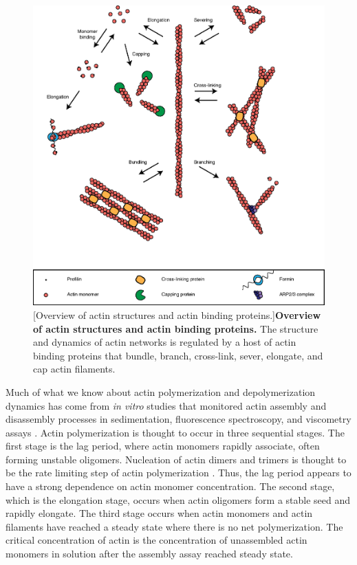 \documentclass{ucetd}
\begin{document}
\begin{figure}[h!]
\centering
\includegraphics[width=1\textwidth]{Figure1-2}
[Overview of actin structures and actin binding proteins.]{\textbf{Overview of actin structures and actin binding proteins.} The structure and dynamics of actin networks is regulated by a host of actin binding proteins that bundle, branch, cross-link, sever, elongate, and cap actin filaments.}
\end{figure}


Much of what we know about actin polymerization and depolymerization dynamics has come from \textit{in vitro} studies that monitored actin assembly and disassembly processes in sedimentation, fluorescence spectroscopy, and viscometry assays \cite{Pollard:2016hj}.  Actin polymerization is thought to occur in three sequential stages.  The first stage is the lag period, where actin monomers rapidly associate, often forming unstable oligomers.  Nucleation of actin dimers and trimers is thought to be the rate limiting step of actin polymerization \cite{Cooper:1983uk}.  Thus, the lag period appears to have a strong dependence on actin monomer concentration.  The second stage, which is the elongation stage, occurs when actin oligomers form a stable seed and rapidly elongate.  The third stage occurs when actin monomers and actin filaments have reached a steady state where there is no net polymerization.  The critical concentration of actin is the concentration of unassembled actin monomers in solution after the assembly assay reached steady state.  
\end{document}
